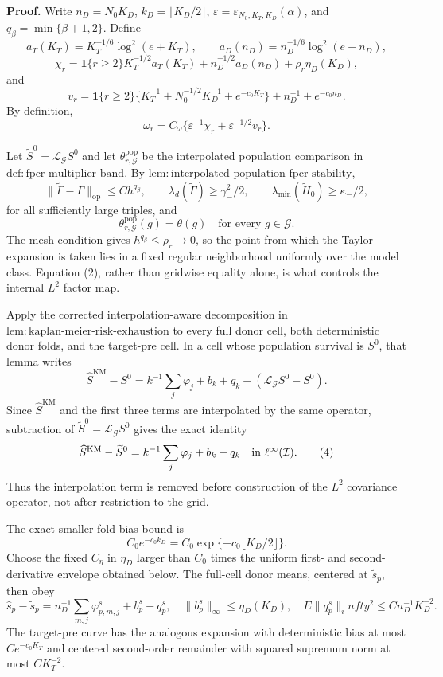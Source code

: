 \textbf{Proof.}
Write \(n_D=N_0K_D\), \(k_D=\lfloor K_D/2\rfloor\), \(\varepsilon=\varepsilon_{N_0,K_T,K_D}(\alpha)\), and \(q_\beta=\min\{\beta+1,2\}\). Define
\[
 a_T(K_T)=K_T^{-1/6}\log^2(e+K_T),
 \qquad
 a_D(n_D)=n_D^{-1/6}\log^2(e+n_D),
\]
\[
 \chi_r=\mathbf 1\{r\ge2\}K_T^{-1/2}a_T(K_T)
       +n_D^{-1/2}a_D(n_D)+\rho_r\eta_D(K_D),
\]
and
\[
 v_r=\mathbf 1\{r\ge2\}
 \{K_T^{-1}+N_0^{-1/2}K_D^{-1}+e^{-c_0K_T}\}
 +n_D^{-1}+e^{-c_0n_D}.
\]
By definition,
\[
 \omega_r=C_\omega\{\varepsilon^{-1}\chi_r+\varepsilon^{-1/2}v_r\}. \tag{1}
\]

Let \(\widetilde S^0=\mathcal L_{\mathcal G}S^0\) and let \(\theta^{\mathrm{pop}}_{r,\mathcal G}\) be the interpolated population comparison in \(\mathrm{def:fpcr\mbox{-}multiplier\mbox{-}band}\). By \(\mathrm{lem:interpolated\mbox{-}population\mbox{-}fpcr\mbox{-}stability}\),
\[
 \|\widetilde\Gamma-\Gamma\|_{\mathrm{op}}
 \le C h^{q_\beta},
 \qquad
 \lambda_d(\widetilde\Gamma)\ge\gamma_-^2/2,
 \qquad
 \lambda_{\min}(\widetilde H_0)\ge\kappa_-/2, \tag{2}
\]
for all sufficiently large triples, and
\[
 \theta^{\mathrm{pop}}_{r,\mathcal G}(g)=\theta(g)
 \quad\text{for every }g\in\mathcal G. \tag{3}
\]
The mesh condition gives \(h^{q_\beta}\le\rho_r\to0\), so the point from which the Taylor expansion is taken lies in a fixed regular neighborhood uniformly over the model class. Equation (2), rather than gridwise equality alone, is what controls the internal \(L^2\) factor map.

Apply the corrected interpolation-aware decomposition in \(\mathrm{lem:kaplan\mbox{-}meier\mbox{-}risk\mbox{-}exhaustion}\) to every full donor cell, both deterministic donor folds, and the target-pre cell. In a cell whose population survival is \(S^0\), that lemma writes
\[
 \widehat S^{\mathrm{KM}}-S^0
 =k^{-1}\sum_j\varphi_j+b_k+q_k+
   (\mathcal L_{\mathcal G}S^0-S^0).
\]
Since \(\widehat S^{\mathrm{KM}}\) and the first three terms are interpolated by the same operator, subtraction of \(\widetilde S^0=\mathcal L_{\mathcal G}S^0\) gives the exact identity
\[
 \widehat S^{\mathrm{KM}}-\widetilde S^0
 =k^{-1}\sum_j\varphi_j+b_k+q_k
 \quad\hbox{in }\ell^\infty(\mathcal I). \tag{4}
\]
Thus the interpolation term is removed before construction of the \(L^2\) covariance operator, not after restriction to the grid.

The exact smaller-fold bias bound is
\[
 C_0e^{-c_0k_D}=C_0\exp\{-c_0\lfloor K_D/2\rfloor\}. \tag{5}
\]
Choose the fixed \(C_\eta\) in \(\eta_D\) larger than \(C_0\) times the uniform first- and second-derivative envelope obtained below. The full-cell donor means, centered at \(\widetilde s_p\), then obey
\[
 \widehat s_p-\widetilde s_p
 =n_D^{-1}\sum_{m,j}\varphi^s_{p,m,j}+b^s_p+q^s_p,
 \quad
 \|b^s_p\|_\infty\le\eta_D(K_D),
 \quad
 E\|q^s_p\|_infty^2\le Cn_D^{-1}K_D^{-2}. \tag{6}
\]
The target-pre curve has the analogous expansion with deterministic bias at most \(Ce^{-c_0K_T}\) and centered second-order remainder with squared supremum norm at most \(CK_T^{-2}\).

